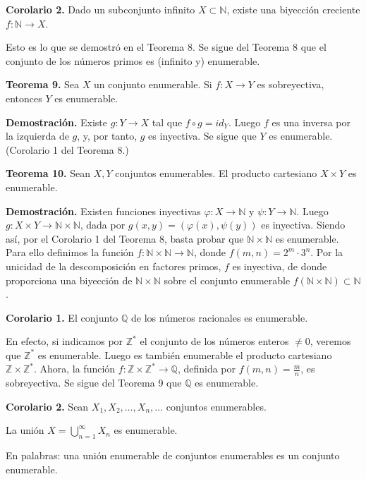 \documentclass[12pt,oneside]{book}
\begin{document}
\textbf{Corolario 2.} Dado un subconjunto infinito \( X \subset \mathbb{N} \), existe una biyección creciente \( f: \mathbb{N} \to X \).

Esto es lo que se demostró en el Teorema 8.
Se sigue del Teorema 8 que el conjunto de los números primos es (infinito y) enumerable.

\textbf{Teorema 9.} Sea \( X \) un conjunto enumerable. Si \( f: X \to Y \) es sobreyectiva, entonces \( Y \) es enumerable.

\textbf{Demostración.} Existe \( g: Y \to X \) tal que \( f \circ g = id_Y \). Luego \( f \) es una inversa por la izquierda de \( g \), y, por tanto, \( g \) es inyectiva. Se sigue que \( Y \) es enumerable. (Corolario 1 del Teorema 8.)

\textbf{Teorema 10.} Sean \( X, Y \) conjuntos enumerables. El producto cartesiano \( X \times Y \) es enumerable.

\textbf{Demostración.} Existen funciones inyectivas \( \varphi: X \to \mathbb{N} \) y \( \psi: Y \to \mathbb{N} \). Luego \( g: X \times Y \to \mathbb{N} \times \mathbb{N} \), dada por \( g(x, y) = (\varphi(x), \psi(y)) \) es inyectiva. Siendo así, por el Corolario 1 del Teorema 8, basta probar que \( \mathbb{N} \times \mathbb{N} \) es enumerable. Para ello definimos la función \( f: \mathbb{N} \times \mathbb{N} \to \mathbb{N} \), donde \( f(m, n) = 2^m \cdot 3^n \). Por la unicidad de la descomposición en factores primos, \( f \) es inyectiva, de donde proporciona una biyección de \( \mathbb{N} \times \mathbb{N} \) sobre el conjunto enumerable \( f(\mathbb{N} \times \mathbb{N}) \subset \mathbb{N} \).

\textbf{Corolario 1.} El conjunto \( \mathbb{Q} \) de los números racionales es enumerable.

En efecto, si indicamos por \( \mathbb{Z}^* \) el conjunto de los números enteros \( \neq 0 \), veremos que \( \mathbb{Z}^* \) es enumerable. Luego es también enumerable el producto cartesiano \( \mathbb{Z} \times \mathbb{Z}^* \). Ahora, la función \( f: \mathbb{Z} \times \mathbb{Z}^* \to \mathbb{Q} \), definida por \( f(m, n) = \frac{m}{n} \), es sobreyectiva. Se sigue del Teorema 9 que \( \mathbb{Q} \) es enumerable.

\textbf{Corolario 2.} Sean \( X_1, X_2, \dots, X_n, \dots \) conjuntos enumerables.

La unión \( X = \bigcup_{n=1}^{\infty} X_n \) es enumerable.

En palabras: una unión enumerable de conjuntos enumerables es un conjunto enumerable.
\end{document}
